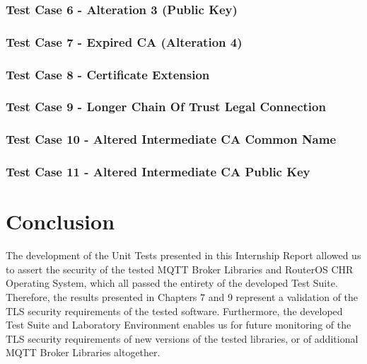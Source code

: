 \documentclass[binding=0.6cm,noexaminfo]{sapthesis}
\begin{document}
\subsection{Test Case 6 - Alteration 3 (Public Key)}
\subsection{Test Case 7 - Expired CA (Alteration 4)}
\subsection{Test Case 8 - Certificate Extension}
\subsection{Test Case 9 - Longer Chain Of Trust Legal Connection}
\subsection{Test Case 10 - Altered Intermediate CA Common Name}
\subsection{Test Case 11 - Altered Intermediate CA Public Key}

\chapter{Conclusion}
The development of the Unit Tests presented in this Internship Report allowed us to assert the security of the tested MQTT Broker Libraries and RouterOS CHR Operating System, which all passed the entirety of the developed Test Suite. Therefore, the results presented in Chapters 7 and 9 represent a validation of the TLS security requirements of the tested software.
Furthermore, the developed Test Suite and Laboratory Environment enables us for future monitoring of the TLS security requirements of new versions of the tested libraries, or of additional MQTT Broker Libraries altogether.

\backmatter
\cleardoublepage
{} %

\printbibliography
\end{document}
